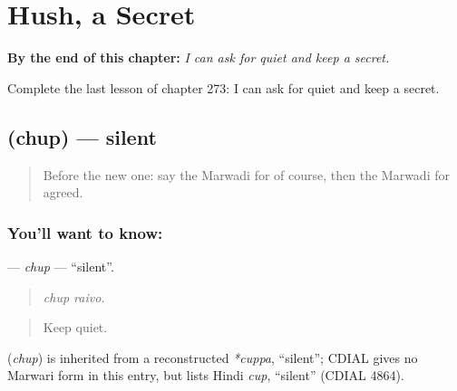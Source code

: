 
\chapter{Hush, a Secret}
\label{ch:mw-hush-a-secret}

\begin{chapteropening}
\textbf{By the end of this chapter:} \emph{I can ask for quiet and keep a secret.}

Complete the last lesson of chapter 273: I can ask for quiet and keep a secret.
\end{chapteropening}

\section[\texorpdfstring{\mw{चुप} (chup)}{चुप (chup)}]{ (chup) — silent}

\label{lesson:MW-C273-chup}



\begin{quote}
Before the new one: say the Marwadi for of course, then the Marwadi for agreed.
\end{quote}

\subsection*{You'll want to know: }
\textbf{} — \emph{chup} — \textquotedblleft{}silent\textquotedblright{}.

\begin{quote}
 
\end{quote}

\begin{quote}
\emph{chup raivo.}
\end{quote}

\begin{quote}
Keep quiet.
\end{quote}

\begin{cousinweb}
\textbf{} (\emph{chup}) is inherited from a reconstructed \emph{*cuppa}, \textquotedblleft{}silent\textquotedblright{}; CDIAL gives no Marwari form in this entry, but lists Hindi \emph{cup}, \textquotedblleft{}silent\textquotedblright{} (CDIAL 4864).
\end{cousinweb}

